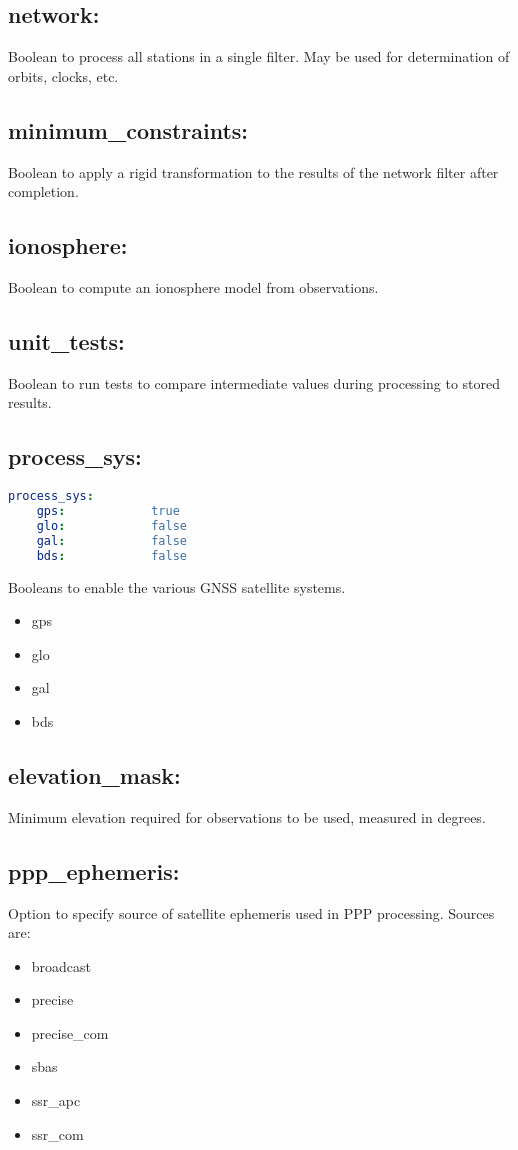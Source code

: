 \subsection*{network:}
Boolean to process all stations in a single filter. May be used for determination of orbits, clocks, etc.

\subsection*{minimum\_constraints:}
Boolean to apply a rigid transformation to the results of the network filter after completion.

\subsection*{ionosphere:}
Boolean to compute an ionosphere model from observations.

\subsection*{unit\_tests:}
Boolean to run tests to compare intermediate values during processing to stored results.


\subsection*{process\_sys:}
\begin{lstlisting}[language=yaml,caption=process\_sys:]
process_sys:
    gps:            true
    glo:            false
    gal:            false
    bds:            false
\end{lstlisting}

Booleans to enable the various GNSS satellite systems.

\begin{itemize}
\item gps
\item glo
\item gal
\item bds
\end{itemize}

\subsection*{elevation\_mask:}
Minimum elevation required for observations to be used, measured in degrees.

\subsection*{ppp\_ephemeris:}
Option to specify source of satellite ephemeris used in PPP processing. Sources are:
\begin{itemize}
\item broadcast
\item precise
\item precise\_com
\item sbas
\item ssr\_apc
\item ssr\_com
\end{itemize}

